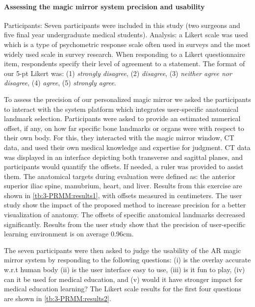 \paragraph{Assessing the magic mirror system precision and usability}
Participants: Seven participants were included in this study (two surgeons and five final year undergraduate medical students). 
Analysis: a Likert scale was used which is a type of psychometric response scale often used in surveys and the most widely used scale in survey research. When responding to a Likert questionnaire item, respondents specify their level of agreement to a statement. The format of our 5-pt Likert was: (1) \textit{strongly disagree}, (2) \textit{disagree}, (3) \textit{neither agree nor disagree}, (4) \textit{agree}, (5) \textit{strongly agree}. 

To assess the precision of our personalized magic mirror we asked the participants to interact with the system platform which integrates user-specific anatomical landmark selection. Participants were asked to provide an estimated numerical offset, if any, on how far specific bone landmarks or organs were with respect to their own body. For this, they interacted with the magic mirror window, CT data, and used their own medical knowledge and expertise for judgment. CT data was displayed in an interface depicting both transverse and sagittal planes, and participants would quantify the offsets. If needed, a ruler was provided to assist them. The anatomical targets during evaluation were defined as: the anterior superior iliac spine, manubrium, heart, and liver. 
Results from this exercise are shown in \tablename{\ref{tb:3-PRMM:results1}}, with offsets measured in centimeters.  The user study show the impact of the proposed method to increase precision for a better visualization of anatomy. The offsets of specific anatomical landmarks decreased significantly. Results from the user study show that the precision of user-specific learning environment is on average 0.96cm.


The seven participants were then asked to judge the usability of the AR magic mirror system by responding to the following questions: (i) is the overlay accurate w.r.t human body (ii) is the user interface easy to use, (iii) is it fun to play, (iv) can it be used for medical education, and (v) would it have stronger impact for medical education learning?
The Likert scale results for the first four questions are shown in \tablename{\ref{tb:3-PRMM:results2}}.


